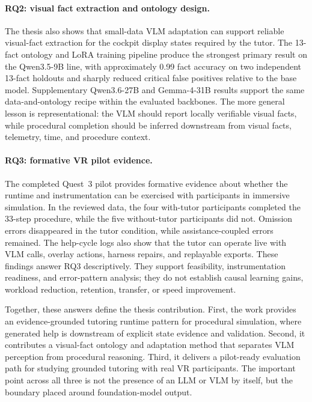 \paragraph{RQ2: visual fact extraction and ontology design.}
The thesis also shows that small-data VLM adaptation can support reliable
visual-fact extraction for the cockpit display states required by the tutor. The
13-fact ontology and LoRA training pipeline produce the strongest primary result
on the Qwen3.5-9B line, with approximately 0.99 fact accuracy on two independent
13-fact holdouts and sharply reduced critical false positives relative to the
base model. Supplementary Qwen3.6-27B and Gemma-4-31B results support the same
data-and-ontology recipe within the evaluated backbones. The more general lesson
is representational: the VLM should report locally verifiable visual facts,
while procedural completion should be inferred downstream from visual facts,
telemetry, time, and procedure context.

\paragraph{RQ3: formative VR pilot evidence.}
The completed Quest~3 pilot provides formative evidence about whether the
runtime and instrumentation can be exercised with participants in immersive
simulation. In the reviewed data, the four with-tutor participants completed the
33-step procedure, while the five without-tutor participants did not. Omission
errors disappeared in the tutor condition, while assistance-coupled errors
remained. The help-cycle logs also show that the tutor can operate live with VLM
calls, overlay actions, harness repairs, and replayable exports. These findings
answer RQ3 descriptively. They support feasibility, instrumentation readiness,
and error-pattern analysis; they do not establish causal learning gains,
workload reduction, retention, transfer, or speed improvement.

Together, these answers define the thesis contribution. First, the work provides
an evidence-grounded tutoring runtime pattern for procedural simulation, where
generated help is downstream of explicit state evidence and validation. Second,
it contributes a visual-fact ontology and adaptation method that separates VLM
perception from procedural reasoning. Third, it delivers a pilot-ready
evaluation path for studying grounded tutoring with real VR participants. The
important point across all three is not the presence of an LLM or VLM by itself,
but the boundary placed around foundation-model output.

